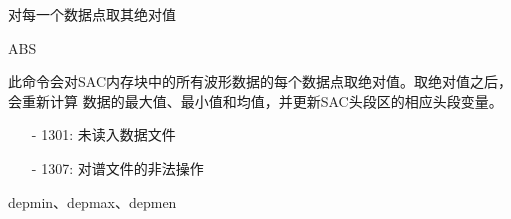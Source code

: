 \label{cmd:abs}

对每一个数据点取其绝对值

\begin{SACSTX}
ABS
\end{SACSTX}

此命令会对SAC内存块中的所有波形数据的每个数据点取绝对值。取绝对值之后，会重新计算
数据的最大值、最小值和均值，并更新SAC头段区的相应头段变量。

\begin{itemize}
\item[-]1301: 未读入数据文件
\item[-]1307: 对谱文件的非法操作
\end{itemize}

depmin、depmax、depmen

